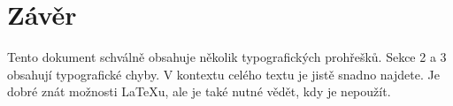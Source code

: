 \documentclass[a4paper, 10pt, twocolumn]{article}
\begin{document}
    \section{Závěr}
    Tento dokument schválně obsahuje několik typografických prohřešků. Sekce 2 a 3 obsahují
    typografické chyby. V kontextu celého textu je jistě snadno najdete. Je dobré znát možnosti
    \LaTeX u, ale je také nutné vědět, kdy je nepoužít.
\end{document}
